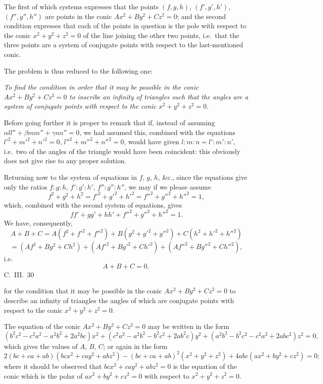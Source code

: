 \documentclass[11pt,a4paper]{article}
\theoremstyle{plain}
\begin{document}
The first of which systems expresses that the points $(f,g,h)$, $(f',g',h')$, $(f'',g'',h'')$ are points in the conic $Ax^2 + By^2 + Cz^2 = 0$; and the second condition expresses that each of the points in question is the pole with respect to the conic $x^2 + y^2 + z^2 = 0$ of the line joining the other two points, i.e.\ that the three points are a system of conjugate points with respect to the last-mentioned conic.

The problem is thus reduced to the following one:

\textit{To find the condition in order that it may be possible in the conic $Ax^2 + By^2 + Cz^2 = 0$ to inscribe an infinity of triangles such that the angles are a system of conjugate points with respect to the conic $x^2 + y^2 + z^2 = 0$.}

Before going further it is proper to remark that if, instead of assuming $\alpha ll'' + \beta mm'' + \gamma nn'' = 0$, we had assumed this, combined with the equations $l'^2 + m'^2 + n'^2 = 0$, $l''^2 + m''^2 + n''^2 = 0$, would have given $l:m:n = l':m':n'$, i.e.\ two of the angles of the triangle would have been coincident: this obviously does not give rise to any proper solution.

Returning now to the system of equations in $f$, $g$, $h$, \&c., since the equations give only the ratios $f:g:h$, $f':g':h'$, $f'':g'':h''$, we may if we please assume
\[
f^2 + g^2 + h^2 = f'^2 + g'^2 + h'^2 = f''^2 + g''^2 + h''^2 = 1,
\]
which, combined with the second system of equations, gives
\[
ff' + gg' + hh' + f''^2 + g''^2 + h''^2 = 1.
\]
We have, consequently,
\[
A + B + C = A(f^2 + f'^2 + f''^2) + B(g^2 + g'^2 + g''^2) + C(h^2 + h'^2 + h''^2)
\]
\[
= (Af^2 + Bg^2 + Ch^2) + (Af'^2 + Bg'^2 + Ch'^2) + (Af''^2 + Bg''^2 + Ch''^2),
\]
i.e.
\[
A + B + C = 0,
\]
\hfill C.~III.~30
\newpage

for the condition that it may be possible in the conic $Ax^2 + By^2 + Cz^2 = 0$ to describe an infinity of triangles the angles of which are conjugate points with respect to the conic $x^2 + y^2 + z^2 = 0$.

The equation of the conic $Ax^2 + By^2 + Cz^2 = 0$ may be written in the form
\[
(b^2c^2 - c^2a^2 - a^2b^2 + 2a^2bc)x^2 + (c^2a^2 - a^2b^2 - b^2c^2 + 2ab^2c)y^2 + (a^2b^2 - b^2c^2 - c^2a^2 + 2abc^2)z^2 = 0,
\]
which gives the values of $A$, $B$, $C$; or again in the form
\[
2(bc + ca + ab)(bcx^2 + cay^2 + abz^2) - (bc + ca + ab)^2(x^2 + y^2 + z^2) + 4abc(ax^2 + by^2 + cz^2) = 0;
\]
where it should be observed that $bcx^2 + cay^2 + abz^2 = 0$ is the equation of the conic which is the polar of $ax^2 + by^2 + cz^2 = 0$ with respect to $x^2 + y^2 + z^2 = 0$.
\end{document}

